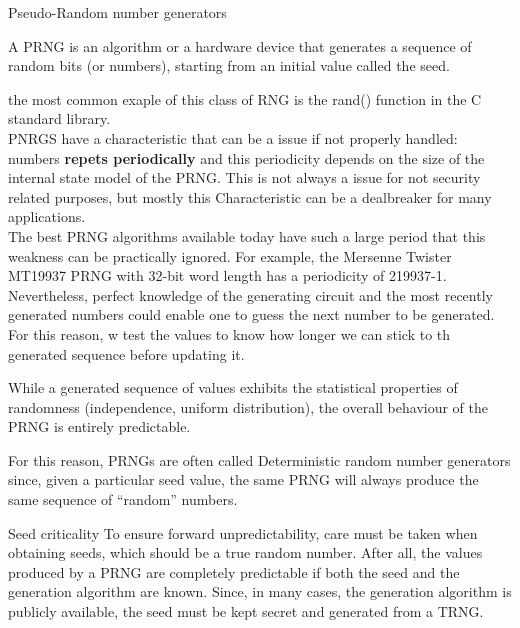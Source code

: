 \begin{section}{Pseudo-Random number generators}
  \begin{boxH}
    A PRNG is an algorithm or a hardware device that generates a sequence of random bits 
    (or numbers), starting from an initial value called the seed.
  \end{boxH}
  the most common exaple of this class of RNG is the rand() function in the C standard 
  library.\\
  PNRGS have a characteristic that can be a issue if not properly handled: numbers \textbf{repets periodically}
  and this periodicity depends on the size of the internal state model of the PRNG.
  This is not always a issue for not security related purposes, but mostly this Characteristic can 
  be a dealbreaker for many applications.\\
  The best PRNG algorithms available today have such a large period that this weakness can be 
  practically ignored. For example, the Mersenne Twister MT19937 PRNG with 32-bit word length has a
  periodicity of 219937-1.\\
  Nevertheless, perfect knowledge of the generating circuit and the most
  recently generated numbers could enable one to guess the next number to
  be generated. For this reason, w test the values to know how longer we can stick to 
  th generated sequence before updating it.
  \begin{boxH}
    While a generated sequence of values exhibits the statistical properties
    of randomness (independence, uniform distribution), the overall behaviour of
    the PRNG is entirely predictable.
  \end{boxH}
  For this reason, PRNGs are often called Deterministic random number generators since, given a 
  particular seed value, the same PRNG will always produce the same sequence of “random” numbers.
  \begin{subsection}{Seed criticality}
    To ensure forward unpredictability, care must be taken when obtaining seeds, which should be a 
    true random number.
    After all, the values produced by a PRNG are completely predictable if both the seed and the
    generation algorithm are known.
    Since, in many cases, the generation algorithm is publicly available, the seed
    must be kept secret and generated from a TRNG.


\end{subsection}
\end{section}
